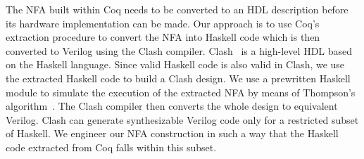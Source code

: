 \documentclass{article}
\begin{document}
The NFA built within Coq needs to be converted to an HDL description
before its hardware implementation can be made.
Our approach is to use Coq's extraction procedure to convert the NFA
into Haskell code which is then converted to Verilog using the Clash
compiler.
Clash~\cite{clash2010} is a high-level HDL 
based on the Haskell language.
Since valid Haskell code is also valid in Clash, we use the extracted
Haskell code to build a Clash design.
We use a prewritten Haskell module to simulate the execution of the
extracted NFA by means of Thompson's algorithm~\cite{thompson1968nfa}.
The Clash compiler then converts the whole design to equivalent Verilog.
Clash can generate synthesizable Verilog code only for a restricted
subset of Haskell.
%
%
We engineer our NFA construction in such a way that the Haskell code
extracted from Coq falls within this subset.
\end{document}
